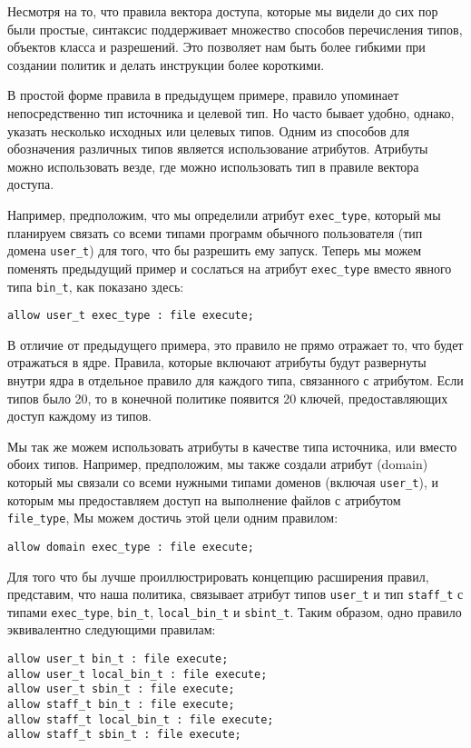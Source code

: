 \documentclass{./../class/UIR}
\begin{document}
	Несмотря на то, что правила вектора доступа, которые мы видели до сих пор были
	простые, синтаксис поддерживает множество способов перечисления типов, объектов
	класса и разрешений. Это позволяет нам быть более гибкими при создании политик
	и делать инструкции более короткими.

	В простой форме правила в предыдущем примере, правило упоминает непосредственно
	тип источника и целевой тип. Но часто бывает удобно, однако,  указать несколько
	исходных или целевых типов. Одним из способов для обозначения различных типов
	является использование атрибутов. Атрибуты можно использовать везде, где можно
	использовать тип в правиле вектора доступа.

    Например, предположим, что мы определили атрибут \verb"exec_type", который
    мы планируем связать со всеми типами программ обычного пользователя (тип
    домена \verb"user_t") для того, что бы разрешить ему запуск. Теперь мы
    можем поменять предыдущий пример и сослаться на атрибут \verb"exec_type"
    вместо явного типа \verb"bin_t", как показано здесь:
\begin{verbatim}
allow user_t exec_type : file execute;
\end{verbatim}
    В отличие от предыдущего примера, это правило не прямо отражает то, что
    будет отражаться в ядре. Правила, которые включают атрибуты будут развернуты
    внутри ядра в отдельное правило для каждого типа, связанного с атрибутом.
    Если типов было 20, то в конечной политике появится 20 ключей,
    предоставляющих доступ каждому из типов.

    Мы так же можем использовать атрибуты в качестве типа источника, или вместо
    обоих типов. Например, предположим, мы также создали атрибут (domain)
    который мы связали со всеми нужными  типами доменов (включая \verb"user_t"),
    и которым мы предоставляем доступ на выполнение файлов с атрибутом
    \verb"file_type", Мы можем достичь этой цели одним правилом:
\begin{verbatim}
allow domain exec_type : file execute;
\end{verbatim}
    Для того что бы лучше проиллюстрировать концепцию расширения правил,
    представим, что наша политика, связывает атрибут типов \verb"user_t" и  тип
    \verb"staff_t" с типами \verb"exec_type", \verb"bin_t",  \verb"local_bin_t"
    и \verb"sbint_t". Таким образом, одно правило эквивалентно следующими
    правилам:
\begin{verbatim}
allow user_t bin_t : file execute;
allow user_t local_bin_t : file execute;
allow user_t sbin_t : file execute;
allow staff_t bin_t : file execute;
allow staff_t local_bin_t : file execute;
allow staff_t sbin_t : file execute;
\end{verbatim}
\end{document}
